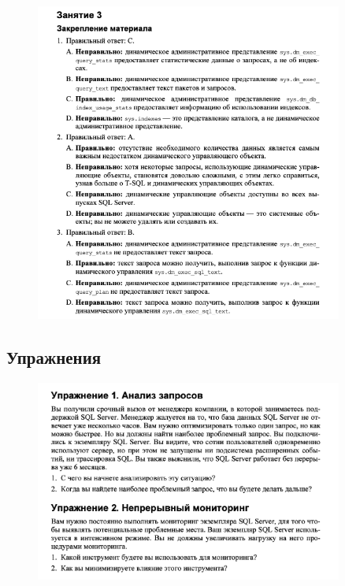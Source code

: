 \begin{figure}[h!]
	\begin{center}
		\includegraphics[width=0.9\textwidth]{img/ans42.png}
	\end{center}
	\captionsetup{justification=centering}
\end{figure}


\newpage
\subsection*{Упражнения}

\begin{figure}[h!]
	\begin{center}
		\includegraphics[width=0.9\textwidth]{img/ex18.png}
	\end{center}
	\captionsetup{justification=centering}
\end{figure}

